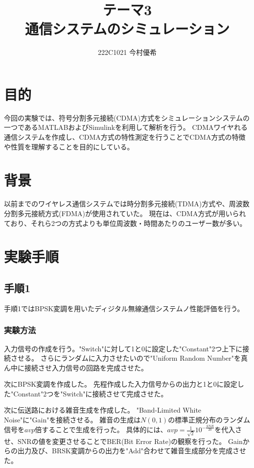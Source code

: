 \documentclass[dvipdfmx]{jsarticle}
\begin{document}
\title{テーマ3 \\通信システムのシミュレーション}
\author{222C1021 今村優希}
\maketitle
\newpage

\section{目的}
今回の実験では、符号分割多元接続(CDMA)方式をシミュレーションシステムの一つであるMATLABおよびSimulinkを利用して解析を行う。
CDMAワイヤれる通信システムを作成し、CDMA方式の特性測定を行うことでCDMA方式の特徴や性質を理解することを目的にしている。

\section{背景}
以前までのワイヤレス通信システムでは時分割多元接続(TDMA)方式や、周波数分割多元接続方式(FDMA)が使用されていた。
現在は、CDMA方式が用いられており、それら2つの方式よりも単位周波数・時間あたりのユーザー数が多い。


\section{実験手順}
\subsection{手順1}
手順1ではBPSK変調を用いたディジタル無線通信システムノ性能評価を行う。

\subsubsection{実験方法}
入力信号の作成を行う。"Switch"に対して1と0に設定した"Constant"2つ上下に接続させる。
さらにランダムに入力させたいので"Uniform Random Number"を真ん中に接続させ入力信号の回路を完成させた。

次にBPSK変調を作成した。
先程作成した入力信号からの出力と1と0に設定した"Constant"2つを"Switch"に接続させて完成させた。

次に伝送路における雑音生成を作成した。
"Band-Limited White Noise"に"Gain"を接続させる。
雑音の生成は$N(0,1)$の標準正規分布のランダム信号を$avp$倍することで生成を行った。
具体的には、$avp=\tfrac{1}{\sqrt{2}}10^{-\frac{SNR}{20}}$を代入させ、SNRの値を変更させることでBER(Bit Error Rate)の観察を行った。
Gainからの出力及び、BRSK変調からの出力を"Add"合わせて雑音生成部分を完成させた。
\end{document}
